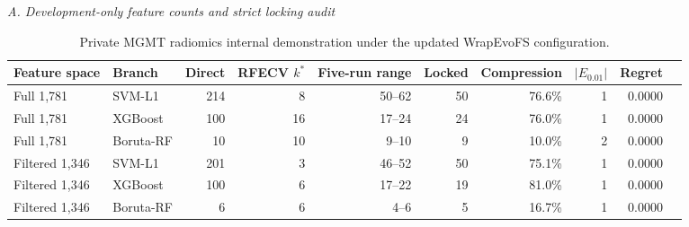 \begin{table}[H]
\centering
\caption{Private MGMT radiomics internal demonstration under the updated WrapEvoFS configuration.}
\label{tab:supp18}
\scriptsize
\setlength{\tabcolsep}{3.0pt}
\renewcommand{\arraystretch}{1.08}
\textit{A. Development-only feature counts and strict locking audit}\par\smallskip
\begin{tabular}{llrrrrrrrr}
\toprule
Feature space & Branch & Direct & RFECV $k^*$ & Five-run range & Locked & Compression & $|E_{0.01}|$ & Regret \\
\midrule
Full 1,781 & SVM-L1 & 214 & 8 & 50--62 & 50 & 76.6\% & 1 & 0.0000 \\
Full 1,781 & XGBoost & 100 & 16 & 17--24 & 24 & 76.0\% & 1 & 0.0000 \\
Full 1,781 & Boruta-RF & 10 & 10 & 9--10 & 9 & 10.0\% & 2 & 0.0000 \\
Filtered 1,346 & SVM-L1 & 201 & 3 & 46--52 & 50 & 75.1\% & 1 & 0.0000 \\
Filtered 1,346 & XGBoost & 100 & 6 & 17--22 & 19 & 81.0\% & 1 & 0.0000 \\
Filtered 1,346 & Boruta-RF & 6 & 6 & 4--6 & 5 & 16.7\% & 1 & 0.0000 \\
\bottomrule
\end{tabular}


\end{table}

